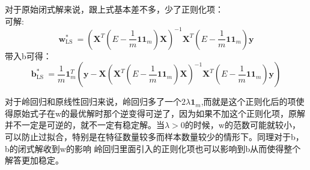 \documentclass[answers]{exam}  %
\begin{document}
\begin{questions}
\begin{solution}
\begin{parts}
        对于原始闭式解来说，跟上式基本差不多，少了正则化项：\\
        可解:
        \[
            \boldsymbol{w}_{\text {LS }}^* = (\boldsymbol{X}^T (E - \frac{1}{m}\boldsymbol{1}\boldsymbol{1}_m) \boldsymbol{X})^{-1} \boldsymbol{X}^T (E - \frac{1}{m}\boldsymbol{1}\boldsymbol{1}_m) \boldsymbol{y}
        \]
        带入b可得：
        \[
            \boldsymbol{b}_{\text {LS }}^* = \frac{1}{m} \boldsymbol{1}_m^T (\boldsymbol{y} - \boldsymbol{X} (\boldsymbol{X}^T (E - \frac{1}{m}\boldsymbol{1}\boldsymbol{1}_m) \boldsymbol{X})^{-1} \boldsymbol{X}^T (E - \frac{1}{m}\boldsymbol{1}\boldsymbol{1}_m) \boldsymbol{y})
        \]

        对于岭回归和原线性回归来说，岭回归多了一个$2\lambda\boldsymbol{1}_m$,而就是这个正则化后的项使得原始式子在w的最优解时那个逆变得可逆了，因为如果不加这个正则化项，原解
        并不一定是可逆的，就不一定有稳定解。当$\lambda > 0$的时候，w的范数可能就较小，可以防止过拟合，特别是在特征数量较多而样本数量较少的情形下。同理对于b，b的闭式解收到w的影响
        岭回归里面引入的正则化项也可以影响到b从而使得整个解答更加稳定。

\end{parts}
\end{solution}
\end{questions}
\end{document}
